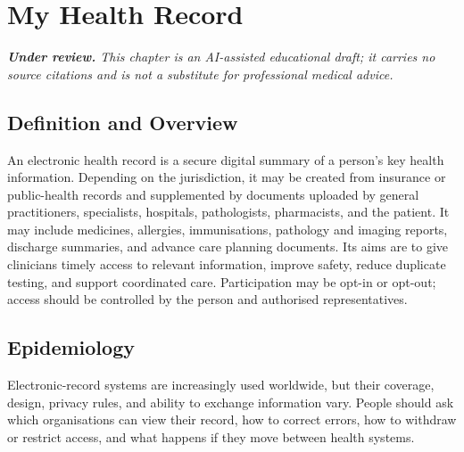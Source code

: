 \chapter{My Health Record}

\medskip
\noindent\textit{\textbf{Under review.} This chapter is an AI-assisted educational draft; it carries no source citations and is not a substitute for professional medical advice.}

\section*{Definition and Overview}
An electronic health record is a secure digital summary of a person's key health information. Depending on the jurisdiction, it may be created from insurance or public-health records and supplemented by documents uploaded by general practitioners, specialists, hospitals, pathologists, pharmacists, and the patient. It may include medicines, allergies, immunisations, pathology and imaging reports, discharge summaries, and advance care planning documents. Its aims are to give clinicians timely access to relevant information, improve safety, reduce duplicate testing, and support coordinated care. Participation may be opt-in or opt-out; access should be controlled by the person and authorised representatives.

\section*{Epidemiology}
Electronic-record systems are increasingly used worldwide, but their coverage, design, privacy rules, and ability to exchange information vary. People should ask which organisations can view their record, how to correct errors, how to withdraw or restrict access, and what happens if they move between health systems.

